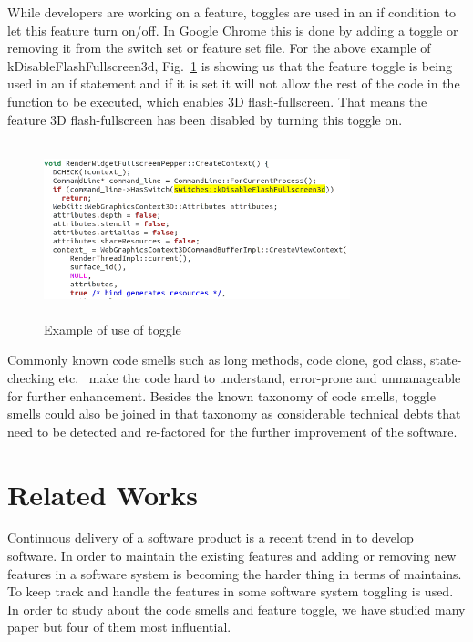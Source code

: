 \documentclass[conference]{IEEEtran}
\begin{document}
While developers are working on a feature, 
toggles are used in an if condition to let this feature
turn on/off. In Google Chrome this is done by adding a toggle 
or removing it from the switch set or feature set file. 
For the above example of kDisableFlashFullscreen3d, 
Fig.~\ref{fig:toggle-use} is showing us that the feature toggle is 
being used in an if statement and if it is set it will not allow the 
rest of the code in the function to be executed, which enables 3D 
flash-fullscreen. That means the feature 3D flash-fullscreen has been 
disabled by turning this toggle on.\\
\begin{figure}
\includegraphics[height=2in,width=3.5in]{figure/toggle-use.png}
\caption{Example of use of toggle}
\label{fig:toggle-use}
\end{figure}

Commonly known code smells such as long methods, code clone, 
god class, state-checking etc.~\cite{marticorena2006extending} make the 
code hard to understand, error-prone and unmanageable for further enhancement. 
Besides the known taxonomy of code smells, toggle smells could also be joined 
in that taxonomy as considerable technical debts that need to be detected 
and re-factored for the further improvement of the software.
\\

\section{Related Works}
\label{related-works}
Continuous delivery of a software product is a recent trend in to develop software\cite{Del2006Continuous}. In order to maintain the existing features and adding or removing new features in a software system is becoming the harder thing in terms of maintains. To keep track and handle the features in some software system toggling is used. In order to study about the code smells and feature toggle, we have studied many paper but four of them most influential.\\
\end{document}
